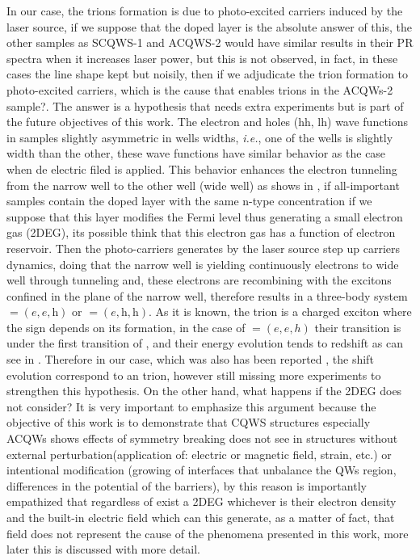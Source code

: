In our case, the trions formation is due to photo-excited carriers induced by the laser source, if we suppose that the doped layer is the absolute answer of this, the other samples as SCQWS-1 and ACQWS-2 would have similar results in their PR spectra when it increases laser power, but this is not observed, in fact, in these cases the line shape kept but noisily, then if we adjudicate the trion formation to photo-excited carriers, which is the cause that enables trions in the ACQWs-2 sample?. The answer is a hypothesis that needs extra experiments but is part of the future objectives of this work. The electron and holes (hh, lh) wave functions in samples slightly asymmetric in wells widths, \textit{i.e.}, one of the wells is slightly width than the other, these wave functions have similar behavior as the case when de electric filed is applied. This behavior enhances the electron tunneling from the narrow well to the other well (wide well) as shows in , if all-important samples contain the doped layer with the same n-type concentration if we suppose that this layer modifies the Fermi level thus generating a small electron gas (2DEG), its possible think that this electron gas has a function of electron reservoir\cite{manassen1996exciton,finkelstein1996negatively}.  Then the photo-carriers generates by the laser source step up carriers dynamics, doing that the narrow well is yielding continuously electrons to wide well through tunneling and, these electrons are recombining with the excitons confined in the plane of the narrow well, therefore results in a three-body system  \xm$=(e,e,\text{h})$ or  \xp$=(e,\text{h},\text{h})$. As it is known, the trion is a charged exciton where the sign depends on its formation, in the case of \xm$=(e,e,h)$  their transition is under the first transition of \xhh, and their energy evolution tends to redshift as can see in . Therefore in our case, which was also has been reported 
\cite{sibeldin2001formation,israel2005trions,manassen1996exciton,kheng1993observation,finkelstein1996negatively}, the shift evolution correspond to an \xm trion, however still missing more experiments to strengthen this hypothesis. On the other hand, what happens if the 2DEG does not consider? 
It is very important to emphasize this argument because the objective of this work is to demonstrate that CQWS structures especially ACQWs shows effects of symmetry breaking does not see in structures without external perturbation(application of:  electric or magnetic field,  strain, etc.) or intentional modification (growing of interfaces that unbalance the QWs region, differences in the potential of the barriers), by this reason is importantly empathized that regardless of exist a 2DEG whichever is their electron density and the built-in electric field which can this generate, as a matter of fact,  that field does not represent the cause of the phenomena presented in this work, more later this is discussed with more detail. 

